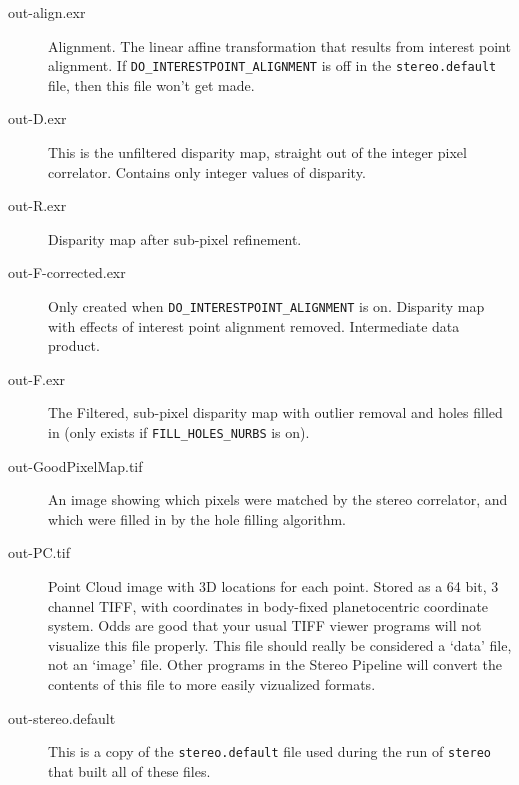 \begin{description}
\item[out-align.exr] Alignment.  The linear affine transformation
that results from interest point alignment.  If
\texttt{DO\_INTERESTPOINT\_ALIGNMENT} is off in the \texttt{stereo.default}
file, then this file won't get made.

\item[out-D.exr] 
This is the unfiltered disparity map, straight out of the integer
pixel correlator.  Contains only integer values of disparity.

\item[out-R.exr] Disparity map after sub-pixel refinement.

\item[out-F-corrected.exr]
Only created when \texttt{DO\_INTERESTPOINT\_ALIGNMENT} is on.
Disparity map with effects of interest point alignment removed.
Intermediate data product.

\item[out-F.exr]
The Filtered, sub-pixel disparity map with outlier removal and holes
filled in (only exists if \texttt{FILL\_HOLES\_NURBS} is on).

\item[out-GoodPixelMap.tif]
An image showing which pixels were matched by the stereo correlator,
and which were filled in by the hole filling algorithm.

\item[out-PC.tif]
Point Cloud image with 3D locations for each point.  Stored as a
64 bit, 3 channel TIFF, with coordinates in body-fixed planetocentric
coordinate system.  Odds are good that your usual TIFF viewer
programs will not visualize this file properly.  This file should
really be considered a `data' file, not an `image' file.  Other
programs in the Stereo Pipeline will convert the contents of this
file to more easily vizualized formats.

\item[out-stereo.default] This is a copy of the \texttt{stereo.default} file
  used during the run of \texttt{stereo} that built all of these
  files.


\end{description}

